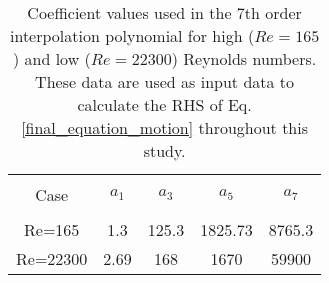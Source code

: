 \begin{table}[ht]

\begin{center}
\setlength{\unitlength}{\textwidth}

\begin{tabular}{c c c c c} %
\hline\hline %
\\[0.2ex]
Case & $a_1$ & $a_3$ & $a_5$ & $a_7$ \\ [0.8ex] %
\hline 
\\[0.8ex]%
Re=165 & 1.3 & 125.3 & 1825.73 & 8765.3 \\[0.8ex] %
Re=22300 & 2.69 & 168 & 1670 & 59900 \\ [1ex] %
\hline %
\end{tabular}

\caption{Coefficient values used in the 7th order interpolation polynomial for high ($Re=165$) and low ($Re=22300$) Reynolds numbers. These data are used as input data to calculate the RHS of Eq.\ref{final_equation_motion} throughout this study.}
 
\label{table:nonlin} %
\end{center}
\end{table}

